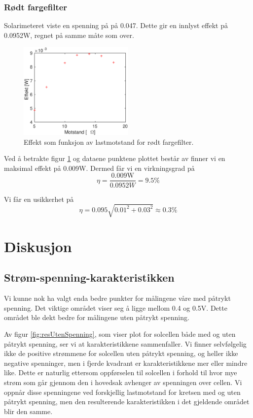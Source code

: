 \documentclass[a4paper,11pt, twocolumn]{article}
\begin{document}
\subsubsection{Rødt fargefilter}
Solarimeteret viste en spenning på på 0.047. Dette gir en innlyst effekt på 0.0952W, regnet på samme måte som over.
\begin{figure}[!ht]
	\includegraphics[width = 0.5\textwidth]{matlab/LAB/effektRed.eps}
	\caption{Effekt som funksjon av lastmotstand for rødt fargefilter.}
	\label{fig:effektRed}
\end{figure}
Ved å betrakte figur \ref{fig:effektRed} og dataene punktene plottet består av finner vi en maksimal effekt på 0.009W. Dermed får vi en virkningsgrad på 
\begin{equation}
	\eta = \frac{0.009\text{W}}{0.0952W} = 9.5\text{\%}
\end{equation}

Vi får en usikkerhet på 
\begin{equation}
	\eta = 0.095\sqrt{0.01^2+0.03^2} \approx 0.3\text{\%}
\end{equation}
\section{Diskusjon}
\subsection{Strøm-spenning-karakteristikken}
Vi kunne nok ha valgt enda bedre punkter for målingene våre med påtrykt spenning. Det viktige området viser seg å ligge mellom 0.4 og 0.5V. Dette området ble dekt bedre for målingene uten påtrykt spenning. 

Av figur \ref{fig:resUtenSpenning}, som viser plot for solcellen både med og uten påtrykt spenning, ser vi at karakteristikkene sammenfaller. Vi finner selvfølgelig ikke de positive strømmene for solcellen uten påtrykt spenning, og heller ikke negative spenninger, men i fjerde kvadrant er karakteristikkene mer eller mindre like. Dette er naturlig ettersom oppførselen til solcellen i forhold til hvor mye strøm som går gjennom den i hovedsak avhenger av spenningen over cellen. Vi oppnår disse spenningene ved forskjellig lastmotstand for kretsen med og uten påtrykt spenning, men den resulterende karakteristikken i det gjeldende området blir den samme.
\end{document}
